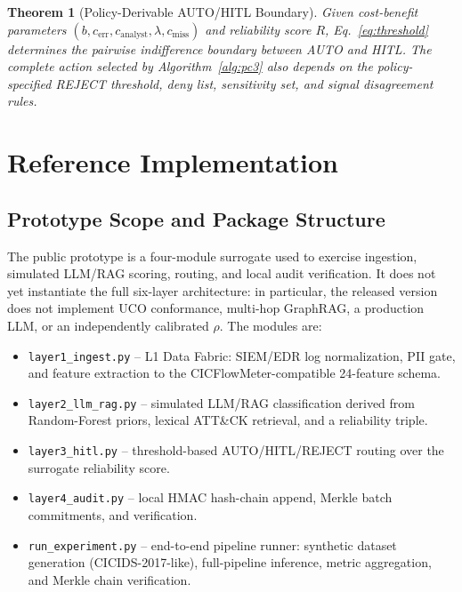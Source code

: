 \documentclass[journal]{IEEEtran}
\newtheorem{theorem}{Theorem}
\begin{document}
\begin{theorem}[Policy-Derivable AUTO/HITL Boundary]
\label{thm:routing}
Given cost-benefit parameters $(b, c_{\text{err}}, c_{\text{analyst}}, \lambda, c_{\text{miss}})$
and reliability score $R$, Eq.~\eqref{eq:threshold} determines the pairwise indifference
boundary between AUTO and HITL. The complete action selected by Algorithm~\ref{alg:pc3}
also depends on the policy-specified REJECT threshold, deny list, sensitivity set, and signal
disagreement rules.
\end{theorem}

\section{Reference Implementation}
\label{sec:implementation}

\subsection{Prototype Scope and Package Structure}
The public prototype is a four-module surrogate used to exercise ingestion, simulated
LLM/RAG scoring, routing, and local audit verification. It does not yet instantiate the full
six-layer architecture: in particular, the released version does not implement UCO conformance,
multi-hop GraphRAG, a production LLM, or an independently calibrated $\rho$. The modules are:

\begin{itemize}[noitemsep,leftmargin=1em]
  \item \texttt{layer1\_ingest.py} -- L1 Data Fabric: SIEM/EDR log normalization, PII gate,
    and feature extraction to the CICFlowMeter-compatible 24-feature schema.
  \item \texttt{layer2\_llm\_rag.py} -- simulated LLM/RAG classification derived from
    Random-Forest priors, lexical ATT\&CK retrieval, and a reliability triple.
  \item \texttt{layer3\_hitl.py} -- threshold-based AUTO/HITL/REJECT routing over the
    surrogate reliability score.
  \item \texttt{layer4\_audit.py} -- local HMAC hash-chain append, Merkle batch
    commitments, and verification.
  \item \texttt{run\_experiment.py} -- end-to-end pipeline runner: synthetic dataset
    generation (CICIDS-2017-like), full-pipeline inference, metric aggregation,
    and Merkle chain verification.
\end{itemize}
\end{document}

